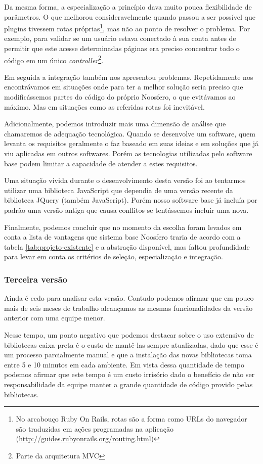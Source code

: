 \documentclass[12pt]{article}
\begin{document}
    Da mesma forma, a especialização a princípio dava muito pouca flexibilidade de parâmetros. O que melhorou consideravelmente quando passou a ser possível que plugins tivessem rotas próprias\footnote{No arcabouço Ruby On Rails, rotas são a forma como URLs do navegador são traduzidas em ações programadas na aplicação (\url{http://guides.rubyonrails.org/routing.html})}, mas não ao ponto de resolver o problema. Por exemplo, para validar se um usuário estava conectado à sua conta antes de permitir que este acesse determinadas páginas era preciso concentrar todo o código em um único \textit{controller}\footnote{Parte da arquitetura MVC}.

    Em seguida a integração também nos apresentou problemas. Repetidamente nos encontrávamos em situações onde para ter a melhor solução seria preciso que modificássemos partes do código do próprio Noosfero, o que evitávamos ao máximo. Mas em situações como as referidas rotas foi inevitável.

    Adicionalmente, podemos introduzir mais uma dimensão de análise que chamaremos de adequação tecnológica. Quando se desenvolve um software, quem levanta os requisitos geralmente o faz baseado em suas ideias e em soluções que já viu aplicadas em outros softwares. Porém as tecnologias utilizadas pelo software base podem limitar a capacidade de atender a estes requisitos.

    Uma situação vivida durante o desenvolvimento desta versão foi ao tentarmos utilizar uma biblioteca JavaScript que dependia de uma versão recente da biblioteca JQuery (também JavaScript). Porém nosso software base já incluía por padrão uma versão antiga que causa conflitos se tentássemos incluir uma nova.

    Finalmente, podemos concluir que no momento da escolha foram levados em conta a lista de vantagens que  sistema base Noosfero traria de acordo com a tabela \ref{tab:projeto-existente} e a abstração disponível, mas faltou profundidade para levar em conta os critérios de seleção, especialização e integração.

    \subsubsection{Terceira versão}
    Ainda é cedo para analisar esta versão. Contudo podemos afirmar que em pouco mais de seis meses de trabalho alcançamos as mesmas funcionalidades da versão anterior com uma equipe menor.

    Nesse tempo, um ponto negativo que podemos destacar sobre o uso extensivo de bibliotecas caixa-preta é o custo de mantê-las sempre atualizadas, dado que esse é um processo parcialmente manual e que a instalação das novas bibliotecas toma entre 5 e 10 minutos em cada ambiente. Em vista dessa quantidade de tempo podemos afirmar que este tempo é um custo irrisório dado o benefício de não ser responsabilidade da equipe manter a grande quantidade de código provido pelas bibliotecas.
\end{document}
